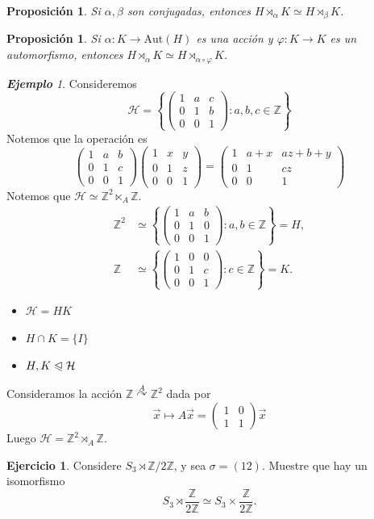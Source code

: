 \documentclass{article}
\newtheorem{proposition}[theorem]{Proposición}
\theoremstyle{definition}
\newtheorem{exercise}{Ejercicio}
\theoremstyle{remark}
\newtheorem{example}[theorem]{\textbf{Ejemplo}}
\numberwithin{equation}{section}
\newcommand{\Z}{\mathbb{Z}}
\renewcommand{\a}{\alpha}
\newcommand{\vphi}{\varphi}
\newcommand{\acts}{\curvearrowright}
\newcommand{\actsby}[1]{\stackrel{#1}{\acts}}
\newcommand{\normal}{\trianglelefteqslant}
\newcommand{\Aut}{\mathrm{Aut}}
\newcommand{\set}[1]{\left\{ #1 \right\}}
\newcommand{\matr}[1]{\begin{pmatrix}#1\end{pmatrix}}
\newcommand{\znz}[1]{\frac{\Z}{#1 \Z}}
\newcommand{\zmz}[1]{\Z/ #1 \Z}
\begin{document}
\begin{proposition}
  Si $\a,\beta$ son conjugadas, entonces $H \rtimes_\a K \simeq H \rtimes_\beta K$.
\end{proposition}

\begin{proposition}
  Si $\a \colon K \to \Aut(H)$ es una acción y $\vphi \colon K \to K$ es un automorfismo, entonces $H \rtimes_\a K \simeq H \rtimes_{\a \circ \vphi} K$.
\end{proposition}

\renewcommand{\H}{\mathcal{H}}

\begin{example}
  Consideremos
  \[\H = \set{\matr{1 & a & c \\ 0 & 1 & b \\ 0 & 0 & 1} : a,b,c \in \Z}\]
  Notemos que la operación es
  \[\matr{1&a&b \\ 0&1&c \\ 0&0&1} \matr{1&x&y \\ 0&1&z \\ 0&0&1} = \matr{1 & a+x & az+b+y \\ 0 & 1 & cz \\ 0 & 0 & 1}\]
  Notemos que $\H \simeq \Z^2 \ltimes_A \Z$.
  \begin{align*}
    \Z^2 &\simeq \set{\matr{1&a&b \\ 0 & 1 & 0 \\ 0 & 0 & 1} : a,b \in \Z} = H, \\
    \Z &\simeq \set{\matr{1&0&0 \\ 0&1&c \\ 0&0&1} : c \in \Z} = K.
  \end{align*}
  \begin{itemize}
    \item $\H = HK$ %
    \item $H \cap K = \{I\}$ %
    \item $H,K \normal \H$ %
  \end{itemize}
  Consideramos la acción $\Z \actsby A \Z^2$ dada por
  \[\vec x \mapsto A \vec x = \matr{1&0\\1&1} \vec x\]
  Luego $\H = \Z^2 \rtimes_A \Z$.
\end{example}

\begin{exercise}
  Considere $S_3 \rtimes \zmz2$, y sea $\sigma = (12)$. Muestre que hay un isomorfismo
  \[S_3 \rtimes \znz 2 \simeq S_3 \times \znz 2.\]
\end{exercise}
\end{document}
